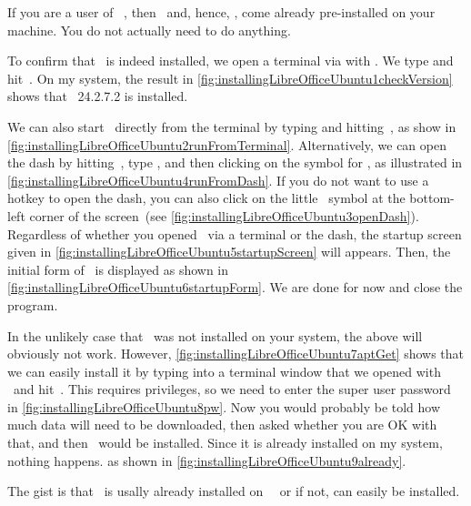 %
If you are a user of \ubuntu\ \linux, then \libreoffice\ and, hence, \libreofficeBase, come already pre-installed on your machine.
You do not actually need to do anything.

To confirm that \libreoffice\ is indeed installed, we open a terminal via with \ubuntuTerminal.
We type  and hit~\keys{\enter}.
On my system, the result in \cref{fig:installingLibreOfficeUbuntu1checkVersion} shows that \libreoffice~24.2.7.2 is installed.

We can also start \libreofficeBase\ directly from the terminal by typing  and hitting~\keys{\enter}, as show in \cref{fig:installingLibreOfficeUbuntu2runFromTerminal}.
Alternatively, we can open the dash by hitting~\keys{\OSwin}, type , and then clicking on the symbol for \libreofficeBase, as illustrated in \cref{fig:installingLibreOfficeUbuntu4runFromDash}.
If you do not want to use a hotkey to open the dash, you can also click on the little \ubuntu\ symbol at the bottom-left corner of the screen~(see \cref{fig:installingLibreOfficeUbuntu3openDash}).
Regardless of whether you opened \libreofficeBase\ via a terminal or the dash, the startup screen given in \cref{fig:installingLibreOfficeUbuntu5startupScreen} will appears.
Then, the initial form of \libreofficeBase\ is displayed as shown in \cref{fig:installingLibreOfficeUbuntu6startupForm}.
We are done for now and close the program.%
%
\begin{sloppypar}%
In the unlikely case that \libreoffice\ was not installed on your system, the above will obviously not work.
However, \cref{fig:installingLibreOfficeUbuntu7aptGet} shows that we can easily install it by typing  into a terminal window that we opened with \ubuntuTerminal\ and hit~\keys{\enter}.
This requires  privileges, so we need to enter the super user password in \cref{fig:installingLibreOfficeUbuntu8pw}.
Now you would probably be told how much data will need to be downloaded, then asked whether you are OK with that, and then \libreoffice\ would be installed.
Since it is already installed on my system, nothing happens. as shown in \cref{fig:installingLibreOfficeUbuntu9already}.%
\end{sloppypar}%
%
The gist is that \libreoffice\ is usally already installed on \ubuntu\ \linux\ or if not, can easily be installed.%
%
\FloatBarrier%
\endhsection%
%
